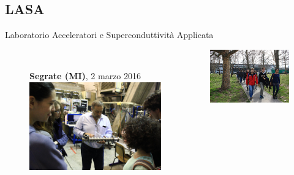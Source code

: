 \documentclass{Bredelebeamer}
\begin{document}
\subsection{LASA}
\begin{frame}{Laboratorio Acceleratori e Superconduttività Applicata}
\begin{figure}
\begin{columns}
\begin{column}{0.5\textwidth}
\\
\centering \textbf{Segrate (MI)}, 2 marzo 2016
\includegraphics[width=5.7cm]{images/LASA1.jpg}

\end{column}
\begin{column}{0.5\textwidth}
\includegraphics[width=5cm]{images/LASA2.jpg}
\end{column}
\end{columns}
\end{figure}
\end{frame}
\end{document}
